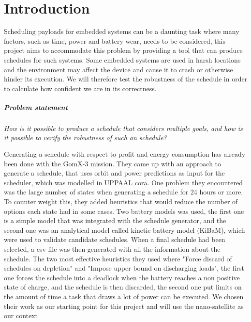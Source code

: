 \chapter{Introduction}\label{cha:intro}
Scheduling payloads for embedded systems can be a daunting task where many factors, such as time, power and battery wear, needs to be considered, this project aims to accommodate this problem by providing a tool that can produce schedules for such systems. Some embedded systems are used in harsh locations and the environment may affect the device and cause it to crash or otherwise hinder its execution. We will therefore test the robustness of the schedule in order to calculate how confident we are in its correctness.

\paragraph{Problem statement}
\textit{How is it possible to produce a schedule that considers multiple goals, and how is it possible to verify the robustness of such an schedule?}


Generating a schedule with respect to profit and energy consumption has already been done with the GomX-3 mission\cite{gomx3}. They came up with an approach to generate a schedule, that uses orbit and power predictions as input for the scheduler, which was modelled in UPPAAL \gls{cora}. One problem they encountered was the large number of states when generating a schedule for 24 hours or more. To counter weight this, they added heuristics that would reduce the number of options each state had in some cases. Two battery models was used, the first one is a simple model that was integrated with the schedule generator, and the second one was an analytical model called kinetic battery model (KiBaM), which were used to validate candidate schedules. When a final schedule had been selected, a csv file was then generated with all the information about the schedule. The two most effective heuristics they used where "Force discard of schedules on depletion" and "Impose upper bound on discharging loads", the first one forces the schedule into a deadlock when the battery reaches a non positive state of charge, and the schedule is then discarded, the second one put limits on the amount of time a task that draws a lot of power can be executed\cite{gomx3}. We chosen their work as our starting point for this project and will use the nano-satellite as our context

